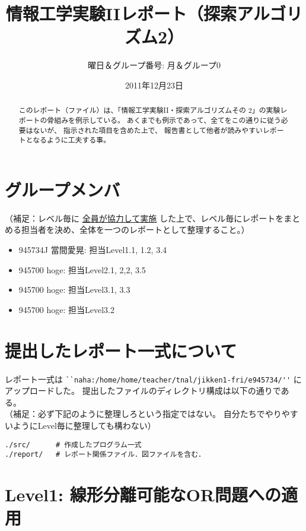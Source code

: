 \documentclass[10pt]{jarticle}
\begin{document}
\title{情報工学実験IIレポート（探索アルゴリズム2）}
\author{曜日＆グループ番号: 月＆グループ0} %
\date{2011年12月23日}

\maketitle

\begin{abstract}
このレポート（ファイル）は、「情報工学実験II・探索アルゴリズムその
2\cite{info2-search2}」の実験レポートの骨組みを例示している。
あくまでも例示であって、全てをこの通りに従う必要はないが、
指示された項目を含めた上で、
報告書として他者が読みやすいレポートとなるように工夫する事。
\end{abstract}

\section*{グループメンバ}
（補足：レベル毎に \underline{全員が協力して実施} した上で、レベル毎にレポートをまとめる担当者を決め、全体を一つのレポートとして整理すること。）
\begin{itemize}
 \item 945734J 當間愛晃: 担当Level1.1, 1.2, 3.4
 \item 945700 hoge: 担当Level2.1, 2,2, 3.5
 \item 945700 hoge: 担当Level3.1, 3.3
 \item 945700 hoge: 担当Level3.2
\end{itemize}

\section*{提出したレポート一式について}
レポート一式は
\verb|``naha:/home/home/teacher/tnal/jikken1-fri/e945734/''|
にアップロードした。
提出したファイルのディレクトリ構成は以下の通りである。\\
（補足：必ず下記のように整理しろという指定ではない。
自分たちでやりやすいようにLevel毎に整理しても構わない）
\begin{breakbox}
\begin{verbatim}
./src/      # 作成したプログラム一式
./report/   # レポート関係ファイル．図ファイルを含む．
\end{verbatim}
\end{breakbox}

\newpage

\section{Level1: 線形分離可能なOR問題への適用}

\end{document}
